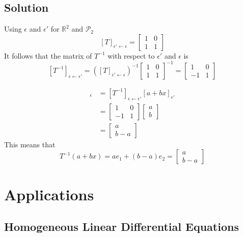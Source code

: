 \subsection*{Solution}
Using $\epsilon$ and $\epsilon'$ for $\mathbb{R}^2$ and $\mathscr{P}_2$
\[
    [T]_{\epsilon'\leftarrow\epsilon}=\begin{bmatrix}
        1 & 0 \\
        1 & 1
    \end{bmatrix}
\]
It follows that the matrix of $T^{-1}$ with respect to $\epsilon'$ and $\epsilon$ is
\[[T^{-1}]_{\epsilon\leftarrow\epsilon'}=([T]_{\epsilon'\leftarrow\epsilon})^{-1}\begin{bmatrix}
        1 & 0 \\
        1 & 1
    \end{bmatrix}^{-1}=\begin{bmatrix}
        1  & 0 \\
        -1 & 1
    \end{bmatrix}\]

\begin{align*}
    [T^{-1}(a+bx)]_{\epsilon} & =[T^{-1}]_{\epsilon\leftarrow\epsilon'}[a+bx]_{\epsilon'} \\
                              & =\begin{bmatrix}
        1  & 0 \\
        -1 & 1
    \end{bmatrix}\begin{bmatrix}
        a \\b
    \end{bmatrix}     \\
                              & =\begin{bmatrix}
        a \\
        b-a
    \end{bmatrix}
\end{align*}
This means that
\[T^{-1}(a+bx)=ae_1+(b-a)e_2=\begin{bmatrix}
        a \\b-a
    \end{bmatrix}\]

\section{Applications}

\subsection*{Homogeneous Linear Differential Equations}

